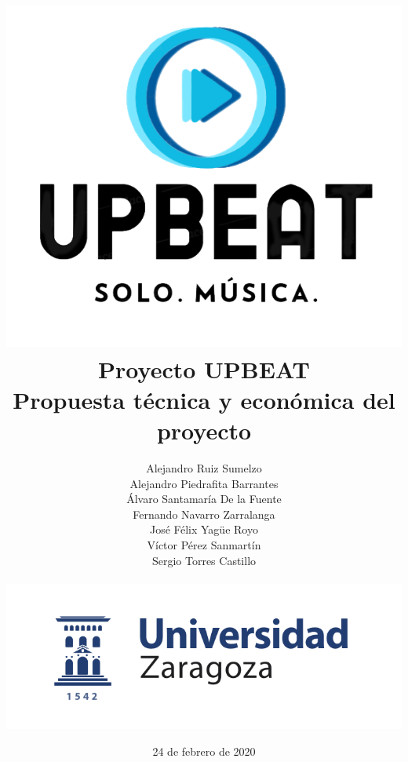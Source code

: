 \documentclass{article}
\begin{document}
\title{\includegraphics[scale=0.65]{logoDefinitivo1.png} \\ \textbf{Proyecto UPBEAT} \\ Propuesta técnica y económica del proyecto \vspace{0.5cm} \\}


\author{Alejandro Ruiz Sumelzo\\
Alejandro Piedrafita Barrantes\\
Álvaro Santamaría De la Fuente\\
Fernando Navarro Zarralanga\\
José Félix Yagüe Royo\\
Víctor Pérez Sanmartín\\
Sergio Torres Castillo \vspace{0.25cm}
\\\\
\includegraphics[scale=0.5]{logoUZ.png}\\
}
\date{24 de febrero de 2020}
\end{document}
